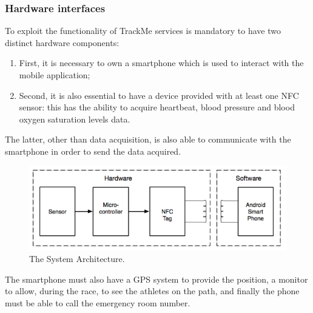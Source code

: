 \subsubsection{Hardware interfaces}
To exploit the functionality of TrackMe services is mandatory to have two distinct hardware components:
\begin{enumerate}
\item First, it is necessary to own a smartphone which is used to interact with the mobile application;
\item Second, it is also essential to have a device provided with at least one NFC sensor: this has the ability to acquire heartbeat, blood pressure and blood oxygen saturation levels data.
\end{enumerate}
The latter, other than data acquisition, is also able to communicate with the smartphone in order to send the data acquired.\\
\begin{figure}[h!]
  \includegraphics[width=\linewidth]{Images/hardware}
  \caption{The System Architecture.}
  \label{fig:The System Architecture}
\end{figure} 
The smartphone must also have a GPS system to provide the position, a monitor to allow, during the race, to see the athletes on the path, and finally the phone must be able to call the emergency room number.

